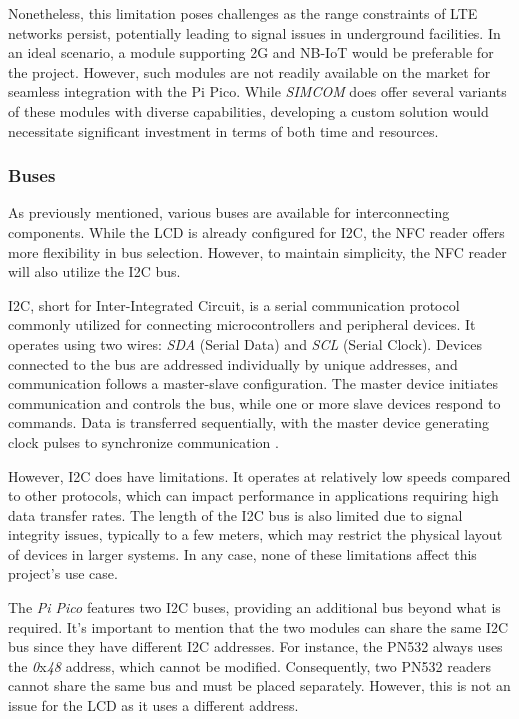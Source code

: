 Nonetheless, this limitation poses challenges as the range constraints of LTE networks persist, potentially leading to 
signal issues in underground facilities. In an ideal scenario, a module supporting 2G and NB-IoT would be preferable for 
the project. However, such modules are not readily available on the market for seamless integration with the Pi Pico. While 
\textit{SIMCOM} does offer several variants of these modules with diverse capabilities, developing a custom solution would 
necessitate significant investment in terms of both time and resources.


\subsubsection*{Buses}

As previously mentioned, various buses are available for interconnecting components. While the LCD is already configured 
for I2C, the NFC reader offers more flexibility in bus selection. However, to maintain simplicity, the NFC reader will 
also utilize the I2C bus.

I2C, short for Inter-Integrated Circuit, is a serial communication protocol commonly utilized for connecting 
microcontrollers and peripheral devices. It operates using two wires: \textit{SDA} (Serial Data) and \textit{SCL} (Serial 
Clock). Devices connected to the bus are addressed individually by unique addresses, and communication follows a 
master-slave configuration. The master device initiates communication and controls the bus, while one or more slave devices 
respond to commands. Data is transferred sequentially, with the master device generating clock pulses to synchronize 
communication \cite{nxpi2c}.

However, I2C does have limitations. It operates at relatively low speeds compared to other protocols, which can impact 
performance in applications requiring high data transfer rates. The length of the I2C bus is also limited due to signal 
integrity issues, typically to a few meters, which may restrict the physical layout of devices in larger systems. In any 
case, none of these limitations affect this project's use case.

The \textit{Pi Pico} features two I2C buses, providing an additional bus beyond what is required. It's important to mention 
that the two modules can share the same I2C bus since they have different I2C addresses. For instance, the PN532 always uses 
the \textit{0}x\textit{48} address, which cannot be modified. Consequently, two PN532 readers cannot share the same bus and 
must be placed separately. However, this is not an issue for the LCD as it uses a different address.

